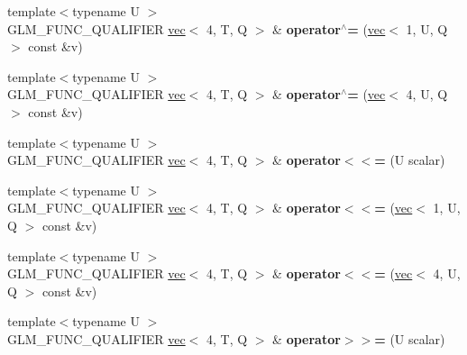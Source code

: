 \begin{DoxyCompactItemize}
{\footnotesize template$<$typename U $>$ }\\G\+L\+M\+\_\+\+F\+U\+N\+C\+\_\+\+Q\+U\+A\+L\+I\+F\+I\+ER \hyperlink{structglm_1_1vec}{vec}$<$ 4, T, Q $>$ \& {\bfseries operator$^\wedge$=} (\hyperlink{structglm_1_1vec}{vec}$<$ 1, U, Q $>$ const \&v)
\item 
\mbox{\label{structglm_1_1vec_3_014_00_01T_00_01Q_01_4_adfc4f1060841f2652c19c17d9980019a}} 
{\footnotesize template$<$typename U $>$ }\\G\+L\+M\+\_\+\+F\+U\+N\+C\+\_\+\+Q\+U\+A\+L\+I\+F\+I\+ER \hyperlink{structglm_1_1vec}{vec}$<$ 4, T, Q $>$ \& {\bfseries operator$^\wedge$=} (\hyperlink{structglm_1_1vec}{vec}$<$ 4, U, Q $>$ const \&v)
\item 
\mbox{\label{structglm_1_1vec_3_014_00_01T_00_01Q_01_4_a2f063a4fd07698015d81f2a66023e021}} 
{\footnotesize template$<$typename U $>$ }\\G\+L\+M\+\_\+\+F\+U\+N\+C\+\_\+\+Q\+U\+A\+L\+I\+F\+I\+ER \hyperlink{structglm_1_1vec}{vec}$<$ 4, T, Q $>$ \& {\bfseries operator$<$$<$=} (U scalar)
\item 
\mbox{\label{structglm_1_1vec_3_014_00_01T_00_01Q_01_4_a49e438063ef5c5937a048b268c29e628}} 
{\footnotesize template$<$typename U $>$ }\\G\+L\+M\+\_\+\+F\+U\+N\+C\+\_\+\+Q\+U\+A\+L\+I\+F\+I\+ER \hyperlink{structglm_1_1vec}{vec}$<$ 4, T, Q $>$ \& {\bfseries operator$<$$<$=} (\hyperlink{structglm_1_1vec}{vec}$<$ 1, U, Q $>$ const \&v)
\item 
\mbox{\label{structglm_1_1vec_3_014_00_01T_00_01Q_01_4_a0e69465cc359e717e6139e33aa441fde}} 
{\footnotesize template$<$typename U $>$ }\\G\+L\+M\+\_\+\+F\+U\+N\+C\+\_\+\+Q\+U\+A\+L\+I\+F\+I\+ER \hyperlink{structglm_1_1vec}{vec}$<$ 4, T, Q $>$ \& {\bfseries operator$<$$<$=} (\hyperlink{structglm_1_1vec}{vec}$<$ 4, U, Q $>$ const \&v)
\item 
\mbox{\label{structglm_1_1vec_3_014_00_01T_00_01Q_01_4_a640417b459496600112faab1b74fcbf8}} 
{\footnotesize template$<$typename U $>$ }\\G\+L\+M\+\_\+\+F\+U\+N\+C\+\_\+\+Q\+U\+A\+L\+I\+F\+I\+ER \hyperlink{structglm_1_1vec}{vec}$<$ 4, T, Q $>$ \& {\bfseries operator$>$$>$=} (U scalar)

\end{DoxyCompactItemize}
